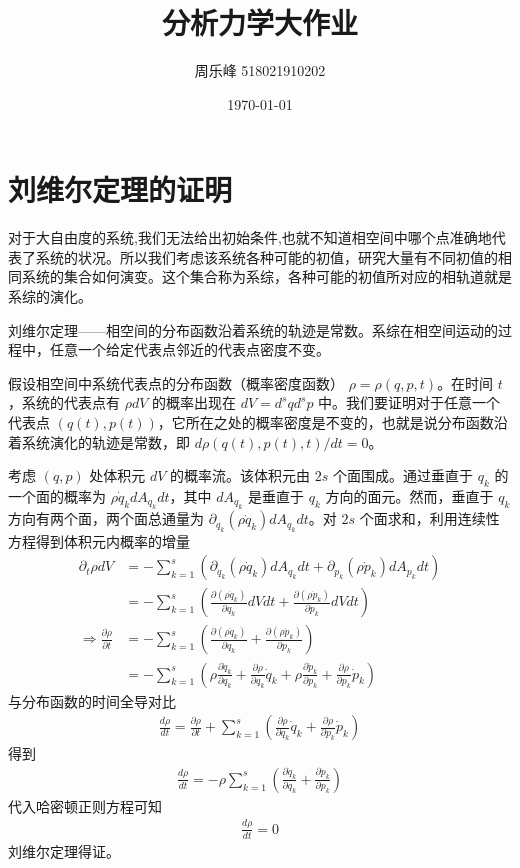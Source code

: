 \documentclass[12pt,a4paper,UTF8]{ctexart}
\title{分析力学大作业}
\author{周乐峰 518021910202}
\date{\today}
\begin{document}
\maketitle

 
\section{刘维尔定理的证明}

对于大自由度的系统,我们无法给出初始条件,也就不知道相空间中哪个点准确地代表了系统的状况。所以我们考虑该系统各种可能的初值，研究大量有不同初值的相同系统的集合如何演变。这个集合称为系综，各种可能的初值所对应的相轨道就是系综的演化。

刘维尔定理——相空间的分布函数沿着系统的轨迹是常数。系综在相空间运动的过程中，任意一个给定代表点邻近的代表点密度不变。

假设相空间中系统代表点的分布函数（概率密度函数） $\rho = \rho(q,p,t)$。在时间 $t$，系统的代表点有 $\rho dV$ 的概率出现在 $dV = d^s q d^s p$ 中。我们要证明对于任意一个代表点 $(q(t),p(t))$，它所在之处的概率密度是不变的，也就是说分布函数沿着系统演化的轨迹是常数，即 $d\rho(q(t),p(t),t)/dt = 0$。

考虑 $(q,p)$ 处体积元 $dV$ 的概率流。该体积元由 $2s$ 个面围成。通过垂直于 $q_k$ 的一个面的概率为 $\rho \dot q_k dA_{q_k} dt$，其中 $dA_{q_k}$ 是垂直于 $q_k$ 方向的面元。然而，垂直于 $q_k$ 方向有两个面，两个面总通量为 $\partial_{q_k}(\rho \dot q_k)dA_{q_k}dt$。对 $2s$ 个面求和，利用连续性方程得到体积元内概率的增量
\begin{align}\label{fluiddiv}
    \partial_t \rho dV &= -\sum_{k = 1}^s (\partial_{q_k}(\rho \dot q_k)dA_{q_k}dt + \partial_{p_k}(\rho \dot p_k)dA_{p_k}dt) \\
    &= -\sum_{k = 1}^s \left(\frac{\partial(\rho \dot q_k)}{\partial q_k}dVdt + \frac{\partial(\rho \dot p_k)}{\partial p_k}dVdt\right) \\
    \Longrightarrow 
    \frac{\partial \rho}{\partial t} &= -\sum_{k = 1}^s \left(\frac{\partial(\rho \dot q_k)}{\partial q_k} + \frac{\partial(\rho \dot p_k)}{\partial p_k}\right) \\
    &= -\sum_{k = 1}^s \left(\rho\frac{\partial \dot q_k}{\partial q_k} + \frac{\partial \rho}{\partial q_k}\dot q_k + \rho\frac{\partial \dot p_k}{\partial p_k} + \frac{\partial \rho}{\partial p_k}\dot p_k\right)
\end{align}
与分布函数的时间全导对比
\begin{align}
    \frac{d\rho}{dt} = \frac{\partial \rho}{\partial t} + \sum_{k = 1}^s \left(\frac{\partial \rho}{\partial q_k}\dot q_k + \frac{\partial \rho}{\partial p_k}\dot p_k\right)
\end{align}
得到
\begin{align}\label{divergence}
    \frac{d\rho}{dt} = -\rho\sum_{k = 1}^s \left(\frac{\partial \dot q_k}{\partial q_k} + \frac{\partial \dot p_k}{\partial p_k}\right)
\end{align}
代入哈密顿正则方程可知
\begin{align}
    \frac{d\rho}{dt} = 0
\end{align}
刘维尔定理得证。
\end{document}
